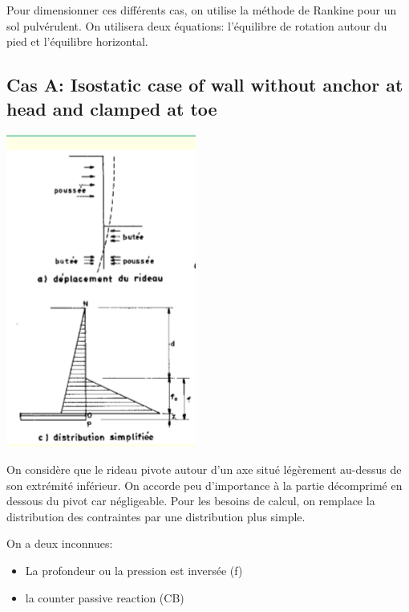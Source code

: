 \medskip

Pour dimensionner ces différents cas, on utilise la méthode de Rankine pour un sol pulvérulent. On utilisera deux équations: l'équilibre de rotation autour du pied et l'équilibre horizontal.

\subsection{Cas A: Isostatic case of wall without anchor at head and clamped at toe}

\begin{center}
\includegraphics [scale=0.8]{pictures/12.PNG}
\end{center}

On considère que le rideau pivote autour d'un axe situé légèrement au-dessus de son extrémité inférieur. On accorde peu d'importance à la partie décomprimé en dessous du pivot car négligeable. Pour les besoins de calcul, on remplace la distribution des contraintes par une distribution plus simple.

On a deux inconnues: 
\begin{itemize}
    \item La profondeur ou la pression est inversée (f)
    \item la counter passive reaction (CB)
\end{itemize}

\medskip


